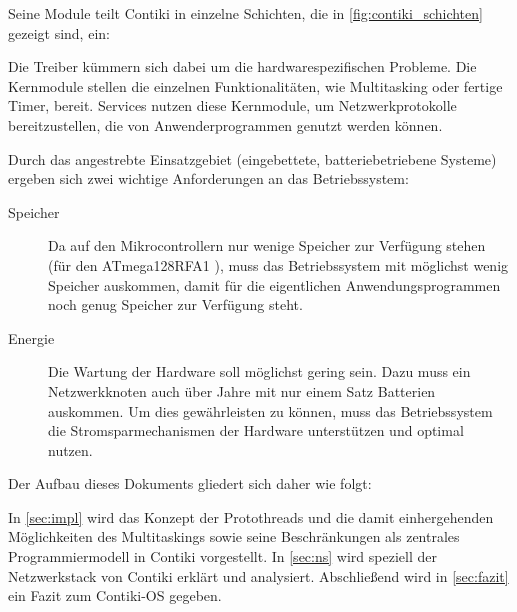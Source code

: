 	Seine Module teilt Contiki in einzelne Schichten,
	die in \autoref{fig:contiki_schichten} gezeigt sind, ein:
	
	Die Treiber kümmern sich dabei um die hardwarespezifischen Probleme.
	Die Kernmodule stellen die einzelnen Funktionalitäten, wie
	Multitasking oder fertige Timer, bereit.  Services nutzen diese
	Kernmodule, um \zB Netzwerkprotokolle bereitzustellen, die von
	Anwenderprogrammen genutzt werden können.

	\medskip

	Durch das angestrebte Einsatzgebiet (eingebettete, batteriebetriebene
	Systeme) ergeben sich zwei wichtige Anforderungen an das Betriebssystem:
	\begin{description}
	\item[Speicher]
		Da auf den Mikrocontrollern nur wenige \kilo\byte{} Speicher
		zur Verfügung stehen (\zB für den ATmega128RFA1
		), muss das Betriebssystem mit
		möglichst wenig Speicher auskommen, damit für die eigentlichen
		Anwendungsprogrammen noch genug Speicher zur Verfügung steht.
	\item[Energie]
		Die Wartung der Hardware soll möglichst gering sein.
		Dazu muss ein Netzwerkknoten auch über Jahre mit nur einem
		Satz Batterien auskommen.
		Um dies gewährleisten zu können, muss das Betriebssystem
		die Stromsparmechanismen der Hardware unterstützen und optimal
		nutzen.
	\end{description}

	\medskip

	Der Aufbau dieses Dokuments gliedert sich daher wie folgt:

	In \autoref{sec:impl} wird das Konzept der Protothreads und die
	damit einhergehenden Möglichkeiten des Multitaskings sowie seine
	Beschränkungen als zentrales Programmiermodell in Contiki vorgestellt.
	In \autoref{sec:ns} wird speziell der Netzwerkstack von Contiki
	erklärt und analysiert.
	Abschließend wird in \autoref{sec:fazit} ein Fazit zum Contiki-OS gegeben.

